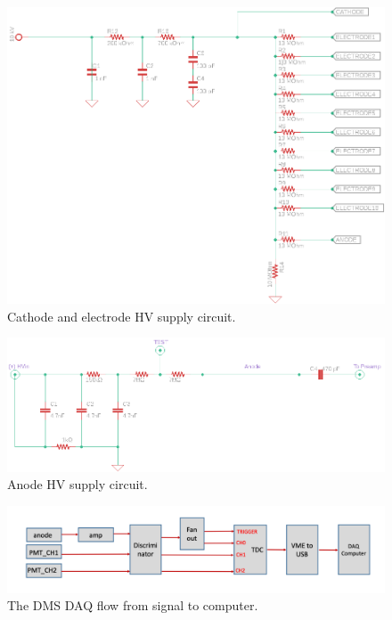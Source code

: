 \begin{figure}[h!]
	\centering
	\includegraphics[width=0.99\linewidth]{figures/dms/electrode_supply.png}
	\caption{Cathode and electrode HV supply circuit.}
	\label{fig:dms_cath_circuit}
\end{figure}
\begin{figure}[h!]
	\centering
	\includegraphics[width=0.99\linewidth]{figures/dms/anode_supply.png}
	\caption{Anode HV supply circuit.}
	\label{fig:dms_anode_circuit}
\end{figure}
\begin{figure}[h!]
	\centering
	\includegraphics[width=0.95\linewidth]{figures/dms/DAQ_flowchart.png}
	\caption{The DMS DAQ flow from signal to computer.}
	\label{fig:dms_daqflow}
\end{figure}

